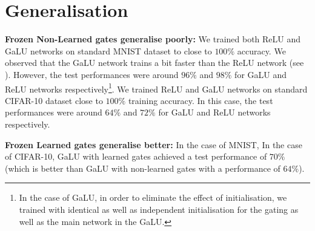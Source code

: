 \section{Generalisation}\label{sec:generalisation}
\textbf{Frozen Non-Learned gates generalise poorly:} We trained both ReLU and GaLU networks on standard MNIST dataset to close to $100\%$ accuracy. We observed that the GaLU network trains a bit faster than the ReLU network (see  ). However, the test performances were around $96\%$ and  $98\%$ for GaLU and ReLU networks respectively\footnote{In the case of GaLU, in order to eliminate the effect of initialisation, we trained with identical as well as independent initialisation for the gating as well as the main network in the GaLU. }. We trained ReLU and GaLU networks on standard CIFAR-10 dataset close to $100\%$ training accuracy. In this case, the test performances were around $64\%$ and $72\%$ for GaLU and ReLU networks respectively. 

\textbf{Frozen Learned gates generalise better:} In the case of MNIST, 
In the case of CIFAR-10, GaLU with learned gates achieved a test performance of $70\%$ (which is better than GaLU with non-learned gates with a performance of  $64\%$).




